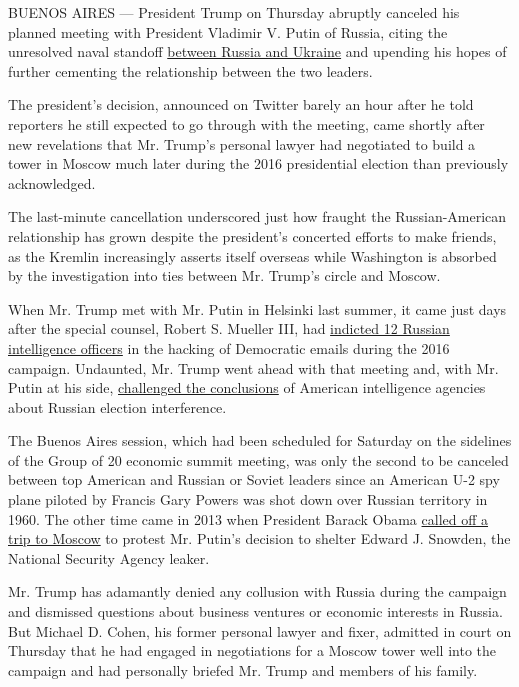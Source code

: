 BUENOS AIRES --- President Trump on Thursday abruptly canceled his
planned meeting with President Vladimir V. Putin of Russia, citing the
unresolved naval standoff
\href{https://www.nytimes3xbfgragh.onion/2018/11/26/world/europe/russia-ukraine-kerch-strait.html}{between
Russia and Ukraine} and upending his hopes of further cementing the
relationship between the two leaders.

The president's decision, announced on Twitter barely an hour after he
told reporters he still expected to go through with the meeting, came
shortly after new revelations that Mr. Trump's personal lawyer had
negotiated to build a tower in Moscow much later during the 2016
presidential election than previously acknowledged.

The last-minute cancellation underscored just how fraught the
Russian-American relationship has grown despite the president's
concerted efforts to make friends, as the Kremlin increasingly asserts
itself overseas while Washington is absorbed by the investigation into
ties between Mr. Trump's circle and Moscow.

When Mr. Trump met with Mr. Putin in Helsinki last summer, it came just
days after the special counsel, Robert S. Mueller III, had
\href{https://www.nytimes3xbfgragh.onion/2018/07/13/us/politics/mueller-indictment-russian-intelligence-hacking.html}{indicted
12 Russian intelligence officers} in the hacking of Democratic emails
during the 2016 campaign. Undaunted, Mr. Trump went ahead with that
meeting and, with Mr. Putin at his side,
\href{https://www.nytimes3xbfgragh.onion/2018/07/16/world/europe/trump-putin-election-intelligence.html}{challenged
the conclusions} of American intelligence agencies about Russian
election interference.

The Buenos Aires session, which had been scheduled for Saturday on the
sidelines of the Group of 20 economic summit meeting, was only the
second to be canceled between top American and Russian or Soviet leaders
since an American U-2 spy plane piloted by Francis Gary Powers was shot
down over Russian territory in 1960. The other time came in 2013 when
President Barack Obama
\href{https://www.nytimes3xbfgragh.onion/2013/08/08/world/europe/obama-cancels-visit-to-putin-as-snowden-adds-to-tensions.html}{called
off a trip to Moscow} to protest Mr. Putin's decision to shelter Edward
J. Snowden, the National Security Agency leaker.

Mr. Trump has adamantly denied any collusion with Russia during the
campaign and dismissed questions about business ventures or economic
interests in Russia. But Michael D. Cohen, his former personal lawyer
and fixer, admitted in court on Thursday that he had engaged in
negotiations for a Moscow tower well into the campaign and had
personally briefed Mr. Trump and members of his family.

